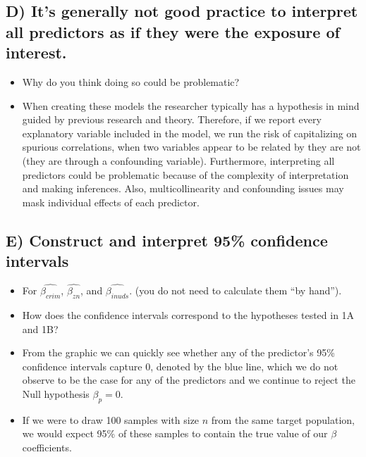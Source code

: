 \documentclass[
  letterpaper,
  DIV=11,
  numbers=noendperiod]{scrartcl}
\begin{document}
\subsection{D) It's generally not good practice to interpret all
predictors as if they were the exposure of
interest.}\label{d-its-generally-not-good-practice-to-interpret-all-predictors-as-if-they-were-the-exposure-of-interest.}

\begin{itemize}
\item
  Why do you think doing so could be problematic?
\item
  When creating these models the researcher typically has a hypothesis
  in mind guided by previous research and theory. Therefore, if we
  report every explanatory variable included in the model, we run the
  risk of capitalizing on spurious correlations, when two variables
  appear to be related by they are not (they are through a confounding
  variable). Furthermore, interpreting all predictors could be
  problematic because of the complexity of interpretation and making
  inferences. Also, multicollinearity and confounding issues may mask
  individual effects of each predictor.
\end{itemize}

\subsection{E) Construct and interpret 95\% confidence
intervals}\label{e-construct-and-interpret-95-confidence-intervals}

\begin{itemize}
\item
  For \(\hat{\beta_{crim}}\), \(\hat{\beta_{zn}}\), and
  \(\hat{\beta_{inuds}}\). (you do not need to calculate them ``by
  hand'').
\item
  How does the confidence intervals correspond to the hypotheses tested
  in 1A and 1B?
\item
  From the graphic we can quickly see whether any of the predictor's
  95\% confidence intervals capture 0, denoted by the blue line, which
  we do not observe to be the case for any of the predictors and we
  continue to reject the Null hypothesis \(\beta_p=0\).
\item
  If we were to draw 100 samples with size \(n\) from the same target
  population, we would expect 95\% of these samples to contain the true
  value of our \(\beta\) coefficients.
\end{itemize}
\end{document}
